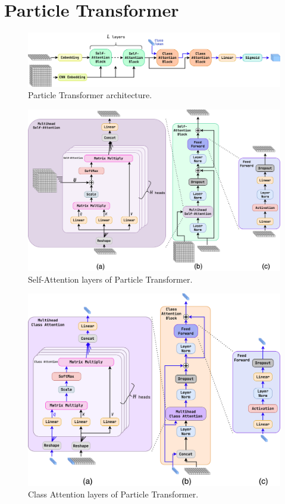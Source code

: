 \section{Particle Transformer}
\label{sec:part}
\begin{figure}[htb]
    \centering
    \includegraphics[width=0.9\linewidth]{src/diagrams/part.png}
    \caption{Particle Transformer architecture.}
    \label{fig:part}
\end{figure}

\begin{figure}[htb]
    \centering
    \includegraphics[width=1\linewidth]{src/diagrams/part_layers_1.png}
    \caption{Self-Attention layers of Particle Transformer.}
    \label{fig:part_SA}
\end{figure}

\begin{figure}[htb]
    \centering
    \includegraphics[width=1\linewidth]{src/diagrams/part_layers_2.png}
    \caption{Class Attention layers of Particle Transformer.}
    \label{fig:part_CA}
\end{figure}

